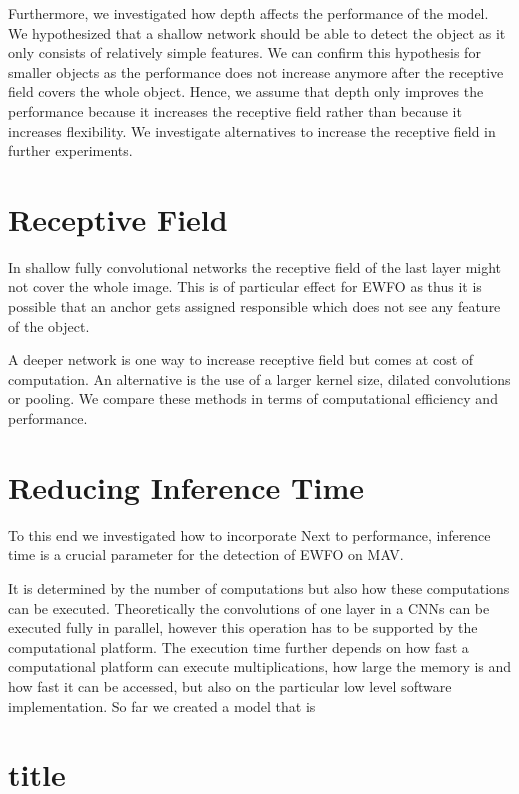 	Furthermore, we investigated how depth affects the performance of the model. We hypothesized that a shallow network should be able to detect the object as it only consists of relatively simple features. We can confirm this hypothesis for smaller objects as the performance does not increase anymore after the receptive field covers the whole object. Hence, we assume that depth only improves the performance because it increases the receptive field rather than because it increases flexibility. We investigate alternatives to increase the receptive field in further experiments. 
	
	\section{Receptive Field}
	
	In shallow fully convolutional networks the receptive field of the last layer might not cover the whole image. This is of particular effect for \ac{EWFO} as thus it is possible that an anchor gets assigned responsible which does not see any feature of the object.
	
	A deeper network is one way to increase receptive field but comes at cost of computation. An alternative is the use of a larger kernel size, dilated convolutions or pooling. We compare these methods in terms of computational efficiency and performance.
		
	\section{Reducing Inference Time}
	
	To this end we investigated how to incorporate 
	Next to performance, inference time is a crucial parameter for the detection of \ac{EWFO} on \ac{MAV}. 
	
	 It is determined by the number of computations but also how these computations can be executed. Theoretically the convolutions of one layer in a \acp{CNN} can be executed fully in parallel, however this operation has to be supported by the computational platform. The execution time further depends on how fast a computational platform can execute multiplications, how large the memory is and how fast it can be accessed, but also on the particular low level software implementation. So far we created a model that is 
	
	\section{title}